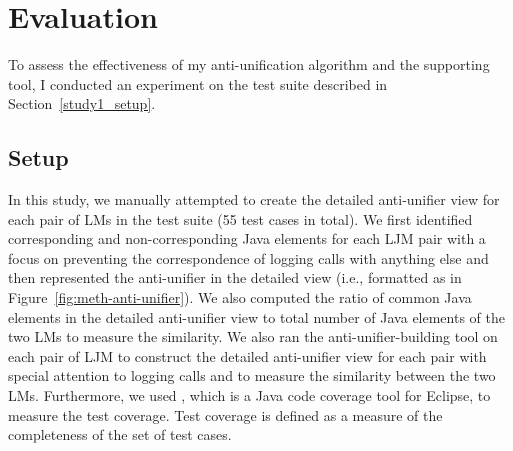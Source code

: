 
\section{Evaluation} \label{anti-unifier-assessment}
To assess the effectiveness of my anti-unification algorithm and the supporting tool, I conducted an experiment on the test suite described in Section~\ref{study1_setup}. %


\subsection{Setup}  \label{study2-setup}
In this study, we manually attempted to create the detailed anti-unifier view for each pair of LMs in the test suite (55 test cases in total). We first identified corresponding and non-corresponding Java elements for each LJM pair with a focus on preventing the correspondence of logging calls with anything else and then represented the anti-unifier in the detailed view (i.e., formatted as in Figure~\ref{fig:meth-anti-unifier}). We also computed the ratio of common Java elements in the detailed anti-unifier view to total number of Java elements of the two LMs to measure the similarity.
We also ran the anti-unifier-building tool on each pair of LJM to construct the detailed anti-unifier view for each pair with special attention to logging calls and to measure the similarity between the two LMs. Furthermore, we used , which is a Java code coverage tool for Eclipse, to measure the test coverage. Test coverage is defined as a measure of the completeness of the set of test cases.



